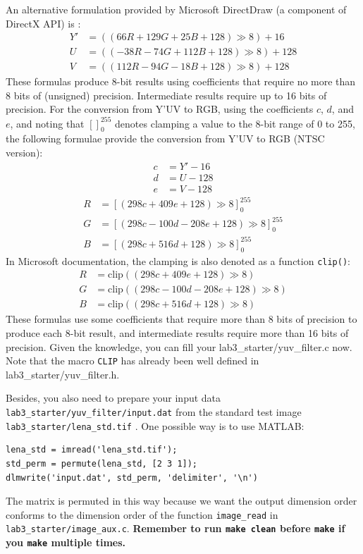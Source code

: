 \documentclass[a4paper,12pt,twoside]{article}
\begin{document}
An alternative formulation provided by Microsoft DirectDraw (a component of DirectX API) is \cite{directdraw}:
\begin{align}
Y' &= ( (  66 R + 129 G +  25 B + 128) \gg 8) +  16 \\
U  &= ( ( -38 R -  74 G + 112 B + 128) \gg 8) + 128 \\
V  &= ( ( 112 R -  94 G -  18 B + 128) \gg 8) + 128
\end{align}
These formulas produce 8-bit results using coefficients that require no more than 8 bits of (unsigned) precision. Intermediate results require up to 16 bits of precision. For the conversion from Y'UV to RGB, using the coefficients $c$, $d$, and $e$, and noting that {$[]_{0}^{255}$} denotes clamping a value to the 8-bit range of 0 to 255, the following formulae provide the conversion from Y'UV to RGB (NTSC version):
\begin{align}
  c &= Y' - 16 \\
  d &= U - 128 \\
  e &= V - 128
\end{align}
\begin{align}
  R &= [( 298 c                + 409 e + 128) \gg 8]_0^{255} \\
  G &= [( 298 c - 100 d - 208 e + 128) \gg 8]_0^{255} \\
  B &= [( 298 c + 516 d                + 128) \gg 8]_0^{255}
\end{align}
In Microsoft documentation, the clamping is also denoted as a function \texttt{clip()}:
\begin{align}
R &= \mathrm{clip}(( 298  c          + 409  e + 128) \gg 8)\\
G &= \mathrm{clip}(( 298  c - 100  d - 208  e + 128) \gg 8)\\
B &= \mathrm{clip}(( 298  c + 516  d          + 128) \gg 8)
\end{align}
These formulas use some coefficients that require more than 8 bits of precision to produce each 8-bit result, and intermediate results require more than 16 bits of precision. Given the knowledge, you can fill your lab3\_starter/yuv\_filter.c now. Note that the macro \texttt{CLIP} has already been well defined in lab3\_starter/yuv\_filter.h.

Besides, you also need to prepare your input data \texttt{lab3\_starter/yuv\_filter/input.dat} from the standard test image \texttt{lab3\_starter/lena\_std.tif} \cite{lenaimg}. One possible way is to use MATLAB:
\begin{verbatim}
lena_std = imread('lena_std.tif');
std_perm = permute(lena_std, [2 3 1]);
dlmwrite('input.dat', std_perm, 'delimiter', '\n')
\end{verbatim}
The matrix is permuted in this way because we want the output dimension order conforms to the dimension order of the function \texttt{image\_read} in \texttt{lab3\_starter/image\_aux.c}. \textbf{Remember to run \texttt{make clean} before \texttt{make} if you \texttt{make} multiple times.}
\end{document}
